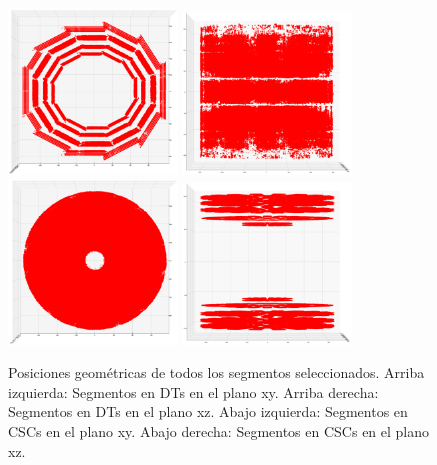 \begin{figure}
\centering
\includegraphics[width=0.4\textwidth]{figures/Hits_DT_xy.png}
\includegraphics[width=0.4\textwidth]{figures/Hits_DT_xz.png}
\includegraphics[width=0.4\textwidth]{figures/Hits_CSC_xy.png}
\includegraphics[width=0.4\textwidth]{figures/Hits_CSC_xz.png}
\caption{Posiciones geom\'etricas de todos los segmentos seleccionados. Arriba izquierda: Segmentos en DTs en el plano xy. Arriba derecha: Segmentos en DTs en el plano xz. Abajo izquierda: Segmentos en CSCs en el plano xy. Abajo derecha: Segmentos en CSCs en el plano xz.}
\label{fig:segments_pos}
\end{figure}


